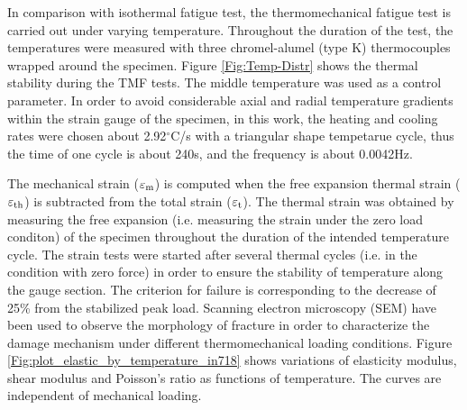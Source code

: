 \documentclass[preprint,5p,twocolumn,11pt,sort&compress]{elsarticle}
\begin{document}
In comparison with isothermal fatigue test, the thermomechanical fatigue test is carried out under varying temperature. Throughout the duration of the test, the temperatures were measured with three chromel-alumel (type K) thermocouples wrapped around the specimen. Figure \ref{Fig:Temp-Distr} shows the thermal stability during the TMF tests. The middle temperature was used as a control parameter. In order to avoid considerable axial and radial temperature gradients within the strain gauge of the specimen, in this work, the heating and cooling rates were chosen about 2.92$^\circ$C/s with a triangular shape tempetarue cycle, thus the time of one cycle is about 240s, and the frequency is about 0.0042Hz.



The mechanical strain ($\varepsilon_{\rm m}$) is computed when the free expansion thermal strain ($\varepsilon_{\rm th}$) is subtracted from the total strain ($\varepsilon_{\rm t}$). The thermal strain was obtained by measuring the free expansion (i.e. measuring the strain under the zero load conditon) of the specimen throughout the duration of the intended temperature cycle. The strain tests were started after several thermal cycles (i.e. in the condition with zero force) in order to ensure the stability of temperature along the gauge section.
The criterion for failure is corresponding to the decrease of 25\% from the stabilized peak load. Scanning electron microscopy (SEM) have been used to observe the morphology of fracture in order to characterize the damage mechanism under different thermomechanical loading conditions.
Figure \ref{Fig:plot_elastic_by_temperature_in718} shows variations of elasticity modulus, shear modulus and Poisson's ratio as functions of temperature. The curves are independent of mechanical loading.
\end{document}
